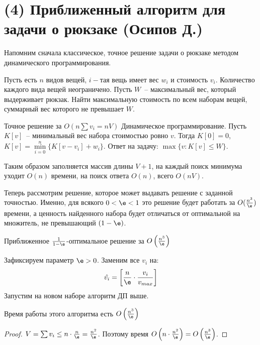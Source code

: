 \section{(4) Приближенный алгоритм для задачи о рюкзаке (Осипов Д.)}
Напомним сначала классическое, точное решение задачи о рюкзаке методом динамического программирования.

\begin{problem*}
	Пусть есть $n$ видов вещей, $i-$тая вещь имеет вес $w_i$ и стоимость $v_i$. Количество каждого вида вещей неограничено. Пусть $W$~-- максимальный вес, который выдерживает рюкзак. Найти максимальную стоимость по всем наборам вещей, суммарный вес которого не превышает $W$.
\end{problem*}

\begin{algodescription}{Точное решение за $O\left(n\sum{v_i}=nV\right)$} Динамическое программирование. Пусть $K[v]$~-- минимальный вес набора стоимостью ровно $v$. Тогда $K[0] = 0$, $K[v] = \underset{i=0}{\overset{n}{\min}} \{K[v-v_i] + w_i\}$. Ответ на задачу: $\max\{v : K[v] \leq W\}$.

Таким образом заполняется массив длины $V+1$, на каждый поиск минимума уходит $O(n)$ времени, на поиск ответа $O(n)$, всего $O(nV)$. 
\end{algodescription}

Теперь рассмотрим решение, которое может выдавать решение с заданной точностью. Именно, для всякого $0 < \e < 1$ это решение будет работать за $O(\frac{n^3}{\e})$ времени, а ценность найденного набора будет отличаться от оптимальной на множитель, не превышающий $(1-\e)$.

\begin{algodescription}{Приближенное $\frac{1}{1-\e}$-оптимальное решение за $O\left(\frac{n^3}{\e}\right)$}

Зафиксируем параметр $\e>0$. Заменим все $v_i$ на: $$\hat{v_i} = \left[\frac{n}{\e} \cdot \frac{v_i}{v_{max}}\right]$$ Запустим на новом наборе алгоритм ДП выше. 
\end{algodescription}

\begin{theorem*}
    Время работы этого алгоритма есть $O\left(\frac{n^3}{\e}\right)$
\end{theorem*}
\begin{proof}
    $V = \sum v_i \leq n\cdot \frac{n}{\e} = \frac{n^2}{\e}$. Поэтому время $O\left(n \cdot \frac{n^2}{\e}\right) = O\left(\frac{n^3}{\e}\right)$.
\end{proof}

